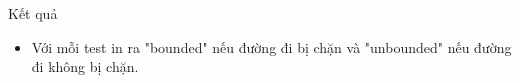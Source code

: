 Kết quả  
\begin{itemize}
	\item     Với mỗi test in ra "bounded" nếu đường đi bị chặn và "unbounded" nếu đường đi không bị chặn.   
\end{itemize}
